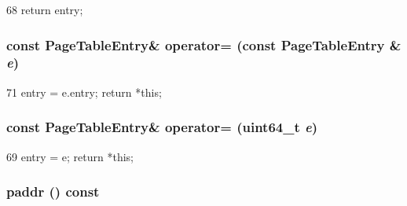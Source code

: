 \begin{DoxyCode}
68 { return entry; }
\end{DoxyCode}
\hypertarget{structAlphaISA_1_1PageTableEntry_a3dc2db6c9f4ed3f6e9a5b199307a78e0}{
\subsubsection[{operator=}]{\setlength{\rightskip}{0pt plus 5cm}const {\bf PageTableEntry}\& operator= (const {\bf PageTableEntry} \& {\em e})}}
\label{structAlphaISA_1_1PageTableEntry_a3dc2db6c9f4ed3f6e9a5b199307a78e0}



\begin{DoxyCode}
71     { entry = e.entry; return *this; }
\end{DoxyCode}
\hypertarget{structAlphaISA_1_1PageTableEntry_aa0ab0fbd3211d9dbc19476a3f0bb0ab8}{
\subsubsection[{operator=}]{\setlength{\rightskip}{0pt plus 5cm}const {\bf PageTableEntry}\& operator= (uint64\_\-t {\em e})}}
\label{structAlphaISA_1_1PageTableEntry_aa0ab0fbd3211d9dbc19476a3f0bb0ab8}



\begin{DoxyCode}
69 { entry = e; return *this; }
\end{DoxyCode}
\hypertarget{structAlphaISA_1_1PageTableEntry_a26f24be1556c1c0ac2c42e1eff5e1197}{
\subsubsection[{paddr}]{ paddr () const}}
\label{structAlphaISA_1_1PageTableEntry_a26f24be1556c1c0ac2c42e1eff5e1197}



